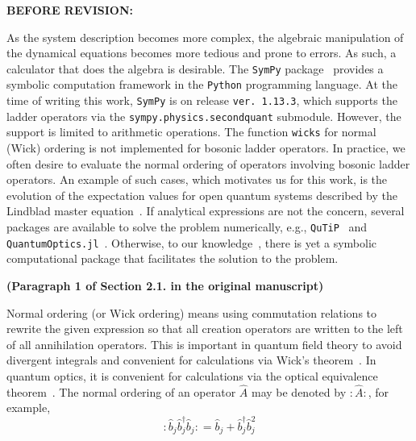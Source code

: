 \documentclass[12pt, a4paper]{article}
\newcommand{\inlinecode}[1]{\texttt{#1}}
\newcommand{\bop}{\hat{b}}
\newcommand{\bdag}{\bop^\dagger}
\newenvironment{revpre}{%
\textbf{{BEFORE REVISION:}}
\par
}
{\bigskip}
\begin{document}
\begin{revpre}
As the system description becomes more complex, the algebraic manipulation of the dynamical equations becomes more tedious and prone to errors. As such, a calculator that does the algebra is desirable. The \texttt{SymPy} package~\cite{meurer_sympy_2017} provides a symbolic computation framework in the \texttt{Python} programming language. At the time of writing this work, \texttt{SymPy} is on release \inlinecode{ver. 1.13.3}, which supports the ladder operators via the \inlinecode{sympy.physics.secondquant} submodule. However, the support is limited to arithmetic operations. The function \inlinecode{wicks} for normal (Wick) ordering is not implemented for bosonic ladder operators. In practice, we often desire to evaluate the normal ordering of operators involving bosonic ladder operators. An example of such cases, which motivates us for this work, is the evolution of the expectation values for open quantum systems described by the Lindblad master equation~\cite{schlosshauer_decoherence_2007, breuer_theory_2002}. If analytical expressions are not the concern, several packages are available to solve the problem numerically, e.g., \texttt{QuTiP}~\cite{johansson_qutip_2012, johansson_qutip_2013} and \texttt{QuantumOptics.jl}~\cite{Kramer2018}. Otherwise, to our knowledge~\cite{chia_relaxation_2020, Shen2023, downing_hyperbolic_2024, Krimer2019, Zens2019, Ahmadi2024, Downing2021, Downing2022, Downing2023, BenArosh2021, Amitai2018.PhysRevE.97.052203, Minganti2019, Chimczak2023, Farina2019, Zhang2021}, there is yet a symbolic computational package that facilitates the solution to the problem.

\textbf{(Paragraph 1 of Section 2.1. in the original manuscript)}

Normal ordering (or Wick ordering) means using commutation relations to rewrite the given expression so that all creation operators are written to the left of all annihilation operators.  This is important in quantum field theory to avoid divergent integrals and convenient for calculations via Wick's theorem~\cite{lancaster_quantum_2014}.  In quantum optics, it is convenient for calculations via the optical equivalence theorem~\cite{gerry_introductory_2005}.  The normal ordering of an operator $\hat{A}$ may be denoted by $:\mathrel{\hat{A}}:$, for example,
\setcounter{equation}{14}
\begin{equation}\label{eq:normal_ordering_example}
    :\mathrel{\bop_j\bdag_j\bop_j}: = \bop_j+\bdag_j\bop_j^2
\end{equation}


\end{revpre}
\end{document}
